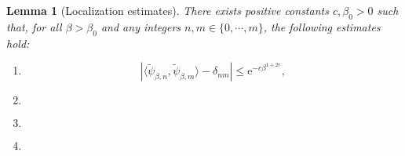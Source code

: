 \documentclass[10pt]{article}
\newcommand{\e}{\mathrm{e}}
\newcommand{\psitilde}{\widetilde\psi}
\newcommand{\1}{\mathbbm 1}
\newtheorem{lemma}{Lemma}
\begin{document}
    \begin{lemma}[Localization estimates]
        \label{lemma:harm_quasimode_estimates}
        There exists positive constants $c,\beta_0 >0$ such that, for all $\beta>\beta_0$ and any integers $n,m \in \{0,\dotsm,m\}$, the following estimates hold:
        \begin{enumerate}[]
            \item{\begin{equation}
                \label{eq:l3_a}
                \left|\langle \psitilde_{\beta,n},\psitilde_{\beta,m}\rangle -\delta_{nm}\right| \leq \e^{-c\beta^{1+2r}},
            \end{equation}}
            \item{
                \begin{equation}
                    \label{eq:l3_b}
                \end{equation}
            }
            \item{
                \begin{equation}
                    \label{eq:l3_c}
                \end{equation}
            }
            \item{
                \begin{equation}
                    \label{eq:l3_d}
                \end{equation}
            }
        \end{enumerate}




    \end{lemma}
\end{document}
